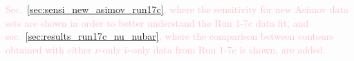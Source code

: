 \textcolor{pink}{
Sec.~\ref{sec:sensi_new_asimov_run17c}, 
where the sensitivity for new Asimov data sets are shown in order to better understand the Run 1-7c data fit,
and 
sec.~\ref{sec:results_run17c_nu_nubar},
where the comparison between contours obtained with either $\nu$-only $\bar{\nu}$-only data
from Run 1-7c is shown,
are added.
}

\clearpage
